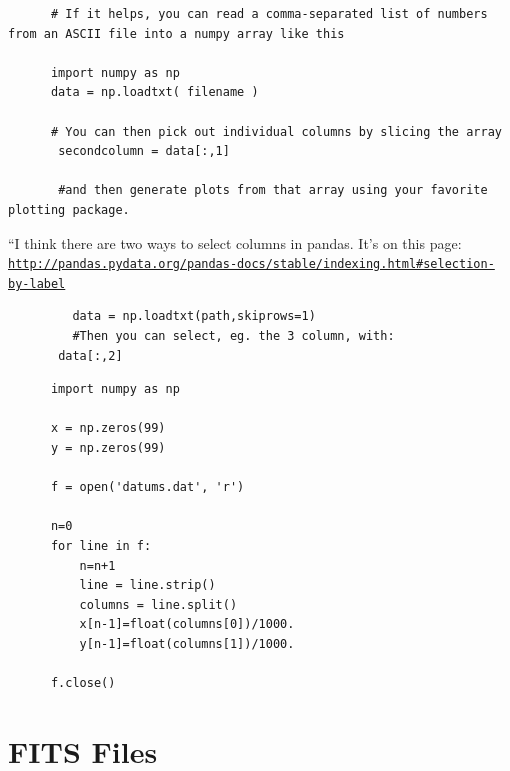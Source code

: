 \documentclass[11pt,a4paper]{article}
\begin{document}
    \begin{lstlisting}
      # If it helps, you can read a comma-separated list of numbers from an ASCII file into a numpy array like this

      import numpy as np
      data = np.loadtxt( filename )
      
      # You can then pick out individual columns by slicing the array
       secondcolumn = data[:,1]
       
       #and then generate plots from that array using your favorite plotting package.
      \end{lstlisting}
      \medskip     \medskip     \medskip

      ``I think there are two ways to select columns in pandas. 
       It’s on this page: 
       \href{http://pandas.pydata.org/pandas-docs/stable/indexing.html\#selection-by-label}{\tt http://pandas.pydata.org/pandas-docs/stable/indexing.html\#selection-by-label}        \\
       \begin{lstlisting}
         data = np.loadtxt(path,skiprows=1)
         #Then you can select, eg. the 3 column, with:
       data[:,2]
      \end{lstlisting}
    \medskip     \medskip     \medskip


    \begin{lstlisting}
      import numpy as np

      x = np.zeros(99)
      y = np.zeros(99)
      
      f = open('datums.dat', 'r')
      
      n=0
      for line in f:
          n=n+1
          line = line.strip()
          columns = line.split()
          x[n-1]=float(columns[0])/1000.
          y[n-1]=float(columns[1])/1000.
          
      f.close()
    \end{lstlisting}





\newpage
\section{FITS Files}\label{sec:FITS}
\end{document}
